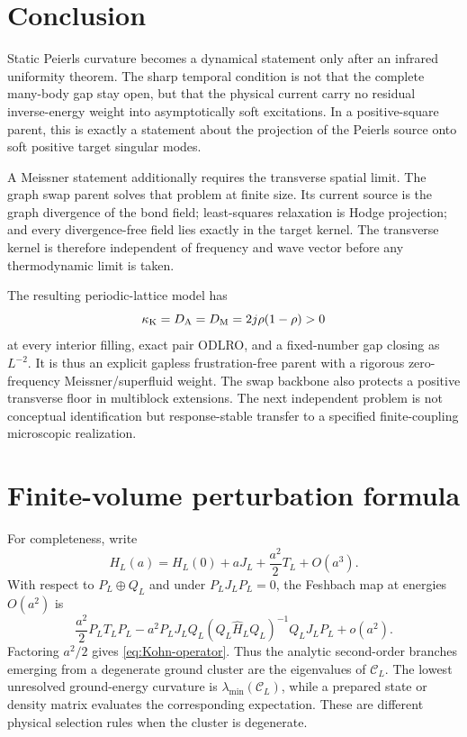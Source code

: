 \documentclass[11pt]{article}
\theoremstyle{definition}
\theoremstyle{remark}
\newcommand{\cC}{\mathcal C}
\begin{document}
\section{Conclusion}

Static Peierls curvature becomes a dynamical statement only after an infrared uniformity theorem.  The
sharp temporal condition is not that the complete many-body gap stay open, but that the physical current
carry no residual inverse-energy weight into asymptotically soft excitations.  In a positive-square parent,
this is exactly a statement about the projection of the Peierls source onto soft positive target singular
modes.

A Meissner statement additionally requires the transverse spatial limit.  The graph swap parent solves
that problem at finite size.  Its current source is the graph divergence of the bond field; least-squares
relaxation is Hodge projection; and every divergence-free field lies exactly in the target kernel.  The
transverse kernel is therefore independent of frequency and wave vector before any thermodynamic limit
is taken.

The resulting periodic-lattice model has
\begin{equation}
 \kappa_{\rm K}=D_{\rm A}=D_{\rm M}=2j\rho(1-\rho)>0
\end{equation}
at every interior filling, exact pair ODLRO, and a fixed-number gap closing as $L^{-2}$.  It is thus an
explicit gapless frustration-free parent with a rigorous zero-frequency Meissner/superfluid weight.  The
swap backbone also protects a positive transverse floor in multiblock extensions.  The next independent
problem is not conceptual identification but response-stable transfer to a specified finite-coupling
microscopic realization.

\appendix

\section{Finite-volume perturbation formula}
\label{app:perturbation}

For completeness, write
\begin{equation}
 H_L(a)=H_L(0)+aJ_L+\frac{a^2}{2}T_L+O(a^3).
\end{equation}
With respect to $P_L\oplus Q_L$ and under $P_LJ_LP_L=0$, the Feshbach map at energies $O(a^2)$ is
\begin{equation}
 \frac{a^2}{2}P_LT_LP_L
 -a^2P_LJ_LQ_L(Q_L\widehat H_LQ_L)^{-1}Q_LJ_LP_L
 +o(a^2).
\end{equation}
Factoring $a^2/2$ gives \eqref{eq:Kohn-operator}.  Thus the analytic second-order branches emerging
from a degenerate ground cluster are the eigenvalues of $\cC_L$.  The lowest unresolved ground-energy
curvature is $\lambda_{\min}(\cC_L)$, while a prepared state or density matrix evaluates the corresponding
expectation.  These are different physical selection rules when the cluster is degenerate.
\end{document}
